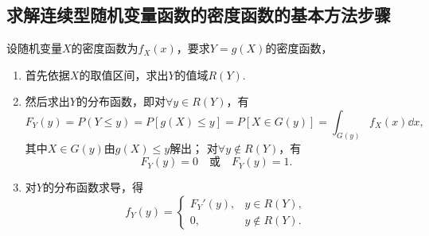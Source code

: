 \subsection{求解连续型随机变量函数的密度函数的基本方法步骤}
设随机变量\(X\)的密度函数为\(f_X(x)\)，要求\(Y = g(X)\)的密度函数，\begin{enumerate}
\item 首先依据\(X\)的取值区间，求出\(Y\)的值域\(R(Y)\).

\item 然后求出\(Y\)的分布函数，即对\(\forall y \in R(Y)\)，有\[
F_Y(y) = P(Y \leq y)
= P[g(X) \leq y]
= P[X \in G(y)]
= \int_{G(y)} f_X(x) \dd{x},
\]
其中\(X \in G(y)\)由\(g(X) \leq y\)解出；
对\(\forall y \notin R(Y)\)，有\[
F_Y(y) = 0
\quad\text{或}\quad
F_Y(y) = 1.
\]

\item 对\(Y\)的分布函数求导，得\[
f_Y(y) = \left\{ \begin{array}{cl}
F_Y'(y), & y \in R(Y), \\
0, & y \notin R(Y).
\end{array} \right.
\]
\end{enumerate}

